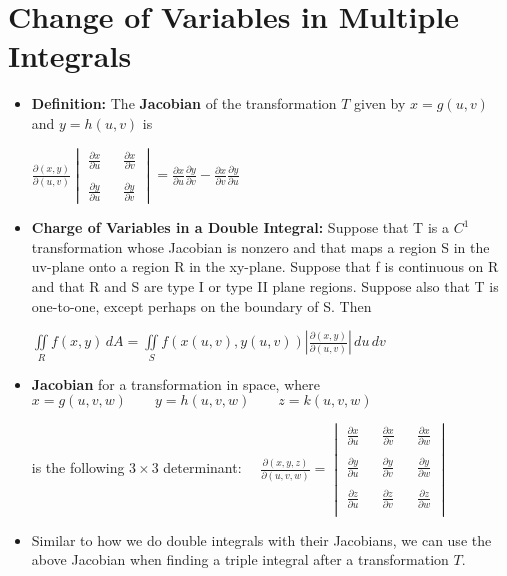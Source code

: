 \documentclass{report}
\begin{document}
	\section{Change of Variables in Multiple Integrals}
		\begin{itemize}\addtolength{\leftskip}{2em}
			\item \textbf{Definition: }The \textbf{Jacobian} of the transformation $T$ given by $x=g(u,v)$ and $y=h(u,v)$ is
			\begin{center}
			\Large $\frac{\partial (x,y)}{\partial (u,v)}\begin{vmatrix}
			\frac{\partial x}{\partial u} && \frac{\partial x}{\partial v}\\
			 \\
			\frac{\partial y}{\partial u} && \frac{\partial y}{\partial v}
			\end{vmatrix}=\frac{\partial x}{\partial u}\frac{\partial y}{\partial v}-\frac{\partial x}{\partial v}\frac{\partial y}{\partial u}$
			\end{center}
			\item \textbf{Charge of Variables in a Double Integral:} Suppose that T is a $C^1$ transformation whose Jacobian is nonzero and that maps a region S in the uv-plane onto a region R in the xy-plane. Suppose that f is continuous on R and that R and S are type I or type II plane regions. Suppose also that T is one-to-one, except perhaps on the boundary of S. Then 
			\begin{center}
			$\iint\limits_{R}f(x,y)\,dA=\iint\limits_{S}f(x(u,v),y(u,v))|\frac{\partial (x,y)}{\partial (u,v)}|\,du\,dv$
			\end{center}
			\item \textbf{Jacobian} for a transformation in space, where $x=g(u,v,w)\quad\quad y=h(u,v,w)\quad\quad z=k(u,v,w)$ 
			\begin{center}
			is the following $3\times 3$ determinant: \Large$\quad \frac{\partial (x,y,z)}{\partial (u,v,w)}=\begin{vmatrix}
			\frac{\partial x}{\partial u} && \frac{\partial x}{\partial v} && \frac{\partial x}{\partial w}\\
			\\
			\frac{\partial y}{\partial u} && \frac{\partial y}{\partial v} && \frac{\partial y}{\partial w}\\
			\\
			\frac{\partial z}{\partial u} && \frac{\partial z}{\partial v} && \frac{\partial z}{\partial w}\\
			\end{vmatrix}$
			\end{center}
			\item Similar to how we do double integrals with their Jacobians, we can use the above Jacobian when finding a triple integral after a transformation $T$.
		\end{itemize}
\end{document}
